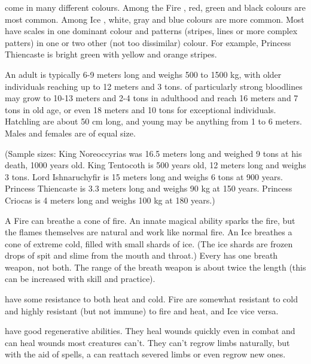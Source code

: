 \Dragons{} come in many different colours. Among the Fire \dragons{}, red, green and black colours are most common. Among Ice \dragons{}, white, gray and blue colours are more common. Most \dragons{} have scales in one dominant colour and patterns (stripes, lines or more complex patters) in one or two other (not too dissimilar) colour. For example, Princess Thiencaste is bright green with yellow and orange stripes. 

An adult \dragon{} is typically 6-9 meters long and weighs 500 to 1500 kg, with older individuals reaching up to 12 meters and 3 tons. \Dragons{} of particularly strong bloodlines may grow to 10-13 meters and 2-4 tons in adulthood and reach 16 meters and 7 tons in old age, or even 18 meters and 10 tons for exceptional individuals. Hatchling \dragons{} are about 50 cm long, and young \dragons{} may be anything from 1 to 6 meters. Males and females are of equal size. 

(Sample sizes: King Noreoccyrias was 16.5 meters long and weighed 9 tons at his death, 1000 years old. King Tentocoth is 500 years old, 12 meters long and weighs 3 tons. %
Lord Ishnaruchyfir is 15 meters long and weighs 6 tons at 900 years. Princess Thiencaste is 3.3 meters long and weighs 90 kg at 150 years. Princess Criocas is 4 meters long and weighs 100 kg at 180 years.) 


A Fire \dragon{} can breathe a cone of fire. An innate magical ability sparks the fire, but the flames themselves are natural and work like normal fire. An Ice \dragon{} breathes a cone of extreme cold, filled with small shards of ice. (The ice shards are frozen drops of spit and slime from the \dragonz{} mouth and throat.) Every \dragon{} has one breath weapon, not both. The range of the breath weapon is about twice the \dragonz{} length (this can be increased with skill and practice). 

\Dragons{} have some resistance to both heat and cold. Fire \dragons{} are somewhat resistant to cold and highly resistant (but not immune) to fire and heat, and Ice \dragons{} vice versa. 

\Dragons{} have good regenerative abilities. They heal wounds quickly even in combat and can heal wounds most creatures can't. They can't regrow limbs naturally, but with the aid of spells, a \dragon{} can reattach severed limbs or even regrow new ones. 

